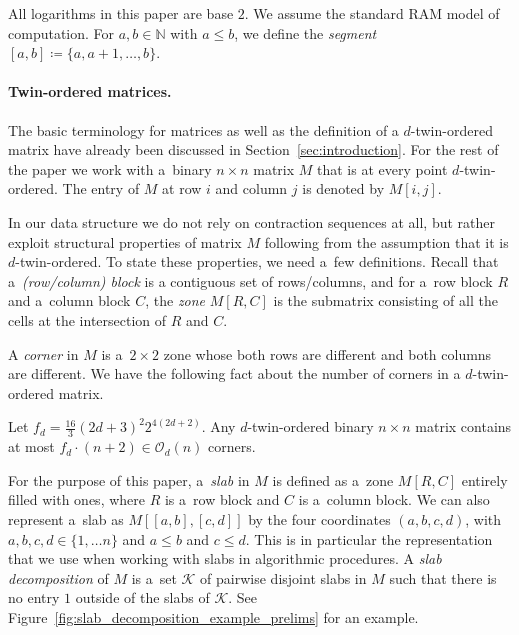 \documentclass[runningheads]{llncs}
\newcommand{\Oh}{\mathcal{O}}
\renewcommand{\leq}{\leqslant}
\begin{document}
All logarithms in this paper are base $2$. We assume the standard RAM model of computation. For $a,b\in \mathbb{N}$ with $a\leq b$, we define the {\em{segment}} $[a,b]\coloneqq \{a,a+1,\ldots,b\}$.

\paragraph*{Twin-ordered matrices.}
The basic terminology for matrices as well as the definition of
a $d$-twin-ordered matrix have already been discussed in
Section~\ref{sec:introduction}.
For the rest of the paper we work with a~binary $n\times n$ matrix $M$
that is at every point $d$-twin-ordered. The entry of $M$ at row $i$ and column $j$ is denoted by $M[i,j]$.




In our data structure we do not rely on contraction sequences at all,
but rather exploit structural properties of matrix $M$ following from
the assumption that it is $d$-twin-ordered. To state these properties,
we need a~few definitions. Recall that a~{\em{(row/column) block}} is
a contiguous set of rows/columns, and for a~row block $R$ and a~column
block $C$, the {\em{zone}} $M[R,C]$ is the submatrix consisting of all
the cells at the intersection of $R$ and $C$.

A {\em{corner}} in $M$ is a~$2\times 2$ zone whose both rows are different and both columns are different. We have the following fact about the number of corners in a $d$-twin-ordered matrix.

\begin{lemma}\label{lem:mixzones}
	Let $f_d=\frac{16}
{3}(2d + 3)^2 2^{4(2d+2)}$.  Any $d$-twin-ordered binary $n \times n$ matrix
	contains at most $f_d \cdot (n+2) \in \Oh_d(n)$ corners.
\end{lemma}


For the purpose of this paper, a~\emph{slab} in
$M$ is defined as a~zone $M[R,C]$ entirely filled with ones, where $R$ is a~row block and $C$ is a~column block. We can also represent a~slab as
$M[[a,b],[c,d]]$ by
the four coordinates $(a,b,c,d)$, with
$a,b,c,d \in \{ 1, \ldots n \}$ and $a\leq b$ and $c\leq d$. This is in particular the representation that we use when working with slabs in algorithmic procedures.
A {\em{slab decomposition}} of $M$
is a~set $\mathcal{K}$ of pairwise disjoint slabs in $M$
such that there is no
entry $1$ outside of the slabs of $\mathcal{K}$. See Figure~\ref{fig:slab_decomposition_example_prelims} for an example.
\end{document}
